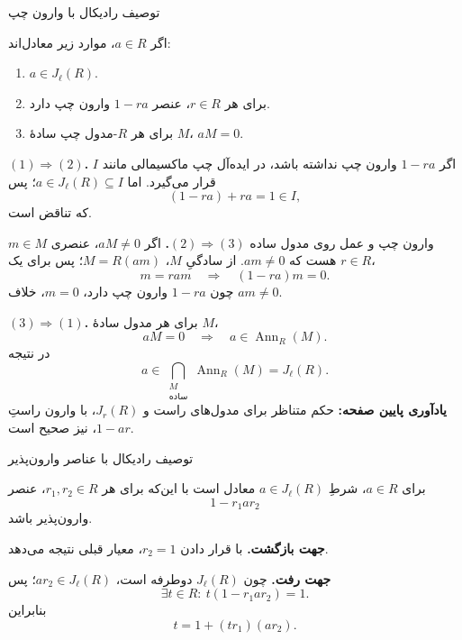 \begin{frame}[t]{توصیف رادیکال با وارون چپ}
\label{lec15:left-inverse-criterion}
\begin{theorem}
اگر \(a\in R\)، موارد زیر معادل‌اند:
\begin{enumerate}
\item \(a\in J_\ell(R)\).
\item برای هر \(r\in R\)، عنصر \(1-ra\) وارون چپ دارد.
\item برای هر \(R\)-مدول چپ سادهٔ \(M\)، \(aM=0\).
\end{enumerate}
\end{theorem}
\textbf{\((1)\Rightarrow(2)\).} اگر \(1-ra\) وارون چپ نداشته باشد، در ایده‌آل چپ ماکسیمالی مانند \(I\) قرار می‌گیرد.
اما \(a\in J_\ell(R)\subseteq I\)؛ پس
\[
 (1-ra)+ra=1\in I,
\]
که تناقض است.
\end{frame}

\begin{frame}[t]{وارون چپ و عمل روی مدول ساده}
\label{lec15:left-inverse-proof}
\textbf{\((2)\Rightarrow(3)\).} اگر \(aM\ne0\)، عنصری \(m\in M\) هست که \(am\ne0\).
از سادگیِ \(M\)، \(M=R(am)\)؛ پس برای یک \(r\in R\)،
\[
 m=ram\quad\Longrightarrow\quad(1-ra)m=0.
\]
چون \(1-ra\) وارون چپ دارد، \(m=0\)، خلاف \(am\ne0\).
\medskip

\textbf{\((3)\Rightarrow(1)\).} برای هر مدول سادهٔ \(M\)،
\[
 aM=0\quad\Longrightarrow\quad a\in\operatorname{Ann}_R(M).
\]
در نتیجه
\[
 a\in\bigcap_{\substack{M\\\text{ساده}}}\operatorname{Ann}_R(M)=J_\ell(R).
\]
\textbf{یادآوری پایین صفحه:} حکم متناظر برای مدول‌های راست و \(J_r(R)\)، با وارون راستِ \(1-ar\)، نیز صحیح است.
\end{frame}

\begin{frame}[t]{توصیف رادیکال با عناصر وارون‌پذیر}
\label{lec15:unit-criterion}
\begin{theorem}
برای \(a\in R\)،
شرطِ \(a\in J_\ell(R)\) معادل است با این‌که برای هر \(r_1,r_2\in R\)، عنصر
\[1-r_1ar_2\]
وارون‌پذیر باشد.
\end{theorem}
\textbf{جهت بازگشت.} با قرار دادن \(r_2=1\)، معیار قبلی نتیجه می‌دهد.
\medskip

\textbf{جهت رفت.} چون \(J_\ell(R)\) دوطرفه است، \(ar_2\in J_\ell(R)\)؛ پس
\[
 \exists t\in R:\ t(1-r_1ar_2)=1.
\]
بنابراین
\[
 t=1+(tr_1)(ar_2).
\]
\end{frame}

